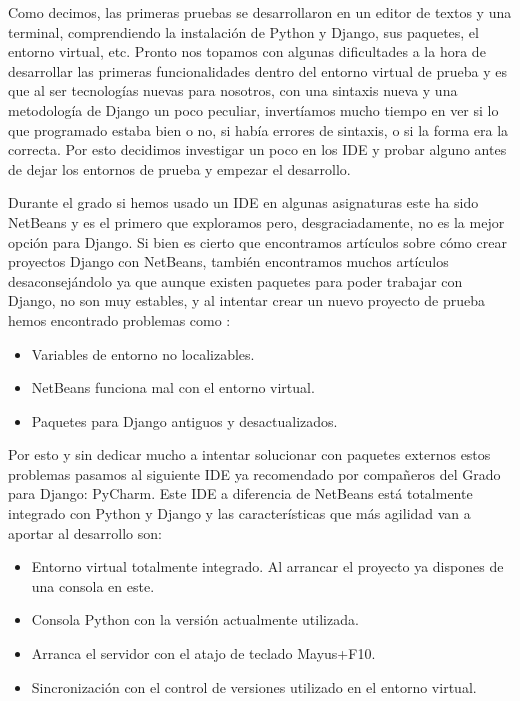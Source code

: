 \bigskip
Como decimos, las primeras pruebas se desarrollaron en un editor de textos y una terminal, comprendiendo la instalación de Python y Django, sus paquetes, el entorno virtual, etc. Pronto nos topamos con algunas dificultades a la hora de desarrollar las primeras funcionalidades dentro del entorno virtual de prueba y es que al ser tecnologías nuevas para nosotros, con una sintaxis nueva y una metodología de Django un poco peculiar, invertíamos mucho tiempo en ver si lo que programado estaba bien o no, si había errores de sintaxis, o si la forma era la correcta. Por esto decidimos investigar un poco en los IDE y probar alguno antes de dejar los entornos de prueba y empezar el desarrollo.

\bigskip
Durante el grado si hemos usado un IDE en algunas asignaturas este ha sido NetBeans y es el primero que exploramos pero, desgraciadamente, no es la mejor opción para Django. Si bien es cierto que encontramos artículos sobre cómo crear proyectos Django con NetBeans, también encontramos muchos artículos desaconsejándolo ya que aunque existen paquetes para poder trabajar con Django, no son muy estables, y al intentar crear un nuevo proyecto de prueba hemos encontrado problemas como :

\begin{itemize}
  \item Variables de entorno no localizables.
  \item NetBeans funciona mal con el entorno virtual.
  \item Paquetes para Django antiguos y desactualizados.
\end{itemize}

Por esto y sin dedicar mucho a intentar solucionar con paquetes externos estos problemas pasamos al siguiente IDE ya recomendado por compañeros del Grado para Django: PyCharm. Este IDE a diferencia de NetBeans está totalmente integrado con Python y Django y las características que más agilidad van a aportar al desarrollo son:

\begin{itemize}
  \item Entorno virtual totalmente integrado. Al arrancar el proyecto ya dispones de una consola en este.
  \item Consola Python con la versión actualmente utilizada.
  \item Arranca el servidor con el atajo de teclado Mayus+F10.
  \item Sincronización con el control de versiones utilizado en el entorno virtual.
\end{itemize}

